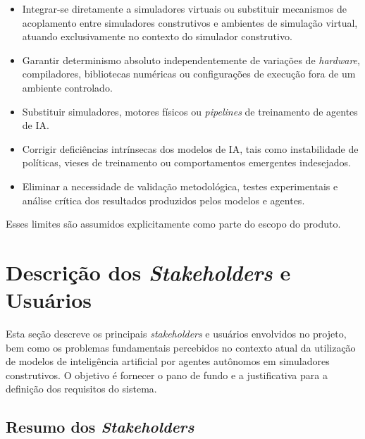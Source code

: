 \begin{itemize}
    \item Integrar-se diretamente a simuladores virtuais ou substituir mecanismos de acoplamento entre simuladores construtivos e ambientes de simulação virtual, atuando exclusivamente no contexto do simulador construtivo.
    \item Garantir determinismo absoluto independentemente de variações de \emph{hardware}, compiladores, bibliotecas numéricas ou configurações de execução fora de um ambiente controlado.
    \item Substituir simuladores, motores físicos ou \emph{pipelines} de treinamento de agentes de IA.
    \item Corrigir deficiências intrínsecas dos modelos de IA, tais como instabilidade de políticas, vieses de treinamento ou comportamentos emergentes indesejados.
    \item Eliminar a necessidade de validação metodológica, testes experimentais e análise crítica dos resultados produzidos pelos modelos e agentes.
\end{itemize}

Esses limites são assumidos explicitamente como parte do escopo do produto.

\section{Descrição dos \emph{Stakeholders} e Usuários}

Esta seção descreve os principais \emph{stakeholders} e usuários envolvidos no projeto, bem como os problemas fundamentais percebidos no contexto atual da utilização de modelos de inteligência artificial por agentes autônomos em simuladores construtivos. O objetivo é fornecer o pano de fundo e a justificativa para a definição dos requisitos do sistema.

\newpage

\subsection{Resumo dos \emph{Stakeholders}}

